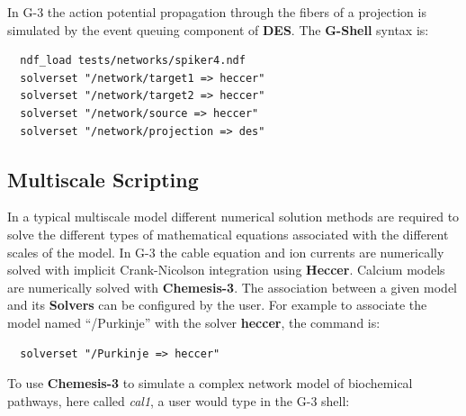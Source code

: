 \documentclass[11pt,3p,twocolumn]{JMN}
\begin{document}
In G-3 the action potential propagation through the fibers of a projection is simulated by the event queuing component of {\bf DES}. The {\bf G-Shell} syntax is:

\begin{tiny}
\begin{verbatim}
  ndf_load tests/networks/spiker4.ndf
  solverset "/network/target1 => heccer"
  solverset "/network/target2 => heccer"
  solverset "/network/source => heccer"
  solverset "/network/projection => des"
\end{verbatim}
\end{tiny}

\subsection{Multiscale Scripting}

In  a typical multiscale model different numerical solution methods are required to solve the different types of mathematical equations associated with the different scales of the model.  In G-3 the cable equation and ion currents are numerically solved with implicit Crank-Nicolson integration using {\bf Heccer}.  Calcium models are numerically solved with {\bf Chemesis-3}. The association between a given model and its {\bf Solvers} can be configured by the user.
For example to associate the model named ``/Purkinje'' with the solver {\bf heccer}, the command is:

\begin{tiny}
\begin{verbatim}
  solverset "/Purkinje => heccer"
\end{verbatim}
\end{tiny}

To use {\bf Chemesis-3} to simulate a complex network model of biochemical pathways, here called {\it cal1}, a user would type in the G-3 shell:
\end{document}
